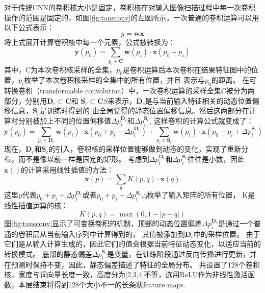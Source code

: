 对于传统CNN的卷积核大小是固定，卷积核在对输入图像扫描过程中每一次卷积操作的范围是固定的，如图\ref{fig:tansconv}的左图所示，一次普通的卷积运算可以用以下公式表示：
\begin{equation}
  y=\mathbf{w}\mathbf{x}
  \end{equation}
  将上式展开计算卷积核中每一个元素，公式被转换为：
  \begin{equation}
    \mathbf{y}\left(p_{0}\right)=\sum_{p_{i} \in \mathbf{C}} \mathbf{w}\left(p_{i}\right) \cdot \mathbf{x}\left(p_{0}+p_{i}\right)
    \end{equation}
其中，C为本次卷积核采样的全集，$p_{0}$是卷积运算后本次卷积在结果特征图中的位置，$p_{i}$枚举了本次卷积核采样的全集中的所有位置，并且
表示与$p_{0}$的距离。
在可转换卷积（transformable convolution）中，一次卷积运算的采样全集C被分为两部分，分别用$\mathbf{D}_{c} \subset \mathbf{C}$和
$\mathbf{S}_{c} \subset \mathbf{C}S$来表示，$\mathbf{D}_{c}$是与当前输入特征相关的动态位置偏移信息，$\mathbf{S}_{c}$是训练时得到的
由全局觉得的静态位置偏移信息。然后这两部分在计算时分别被加上不同的位置偏移值$\Delta p_{i}^{\mathbf{D}_{c}}$和$\Delta p_{i}^{\mathbf{S}_{c}}$,
这样卷积的计算公式就变成了：
\begin{equation}
  \mathbf{y}\left(p_{0}\right)= \sum_{p_{i} \in \mathbf{D}_{c}} \mathbf{w}\left(p_{i}\right) \cdot \mathbf{x}\left(p_{0}+p_{i}+\Delta p_{i}^{\mathbf{D}_{c}}\right) +\sum_{p_{i} \in \mathbf{S}_{c}} \mathbf{w}\left(p_{i}\right) \cdot \mathbf{x}\left(p_{0}+p_{i}+\Delta p_{i}^{\mathbf{S}_{c}}\right)
\end{equation}
现在，$\mathbf{D}_{c}$和$\mathbf{S}_{c}$的引入，卷积核的采样位置能够做到动态的变化，实现了重新分布，而不是像以前一样是固定的矩形。
考虑到$\Delta p_{i}^{\mathbf{D}_{c}}$和$\Delta p_{i}^{\mathbf{S}_{c}}$往往是小数，因此$\mathbf{x}()$的计算采用线性插值的方法：
\begin{equation}
\mathbf{x}(p)=\sum_{q} K(p, q) \cdot \mathbf{x}(q)
\end{equation}
这里p代表$p_{0}+p_{i}+\Delta p_{i}^{\mathbf{D}_{c}}$或者$p_{0}+p_{i}+\Delta p_{i}^{\mathbf{S}_{c}}$,q枚举了输入矩阵的所有位置，
K是线性插值运算的核：
\begin{equation}
K(p, q)=\max (0,1-|p-q|)
\end{equation}
图\ref{fig:tansconv}显示了可变换卷积的机制，顶部的动态位置偏差$\Delta p_{i}^{\mathbf{D}_{c}}$是通过一个普通的卷积层从当前输入序列中计算得到的，
其值被添加到$\mathbf{D}_{c}$中的采样位置。 由于它们是从输入计算生成的，因此它们的值会根据当前特征动态变化，以适应当前的转换模式。 
底部的静态偏差$\Delta p_{i}^{\mathbf{S}_{c}}$是变量，在训练阶段通过反向传播进行更新，并在预测时保持不变，因此，静态偏差描述了特征的全局分布。
共设置了128个卷积核，宽度与词向量长度一致，高度分为[2,3,4]不等，选用ReLU作为非线性激活函数，本层结束将得到128个大小不一的长条状feature maps.


